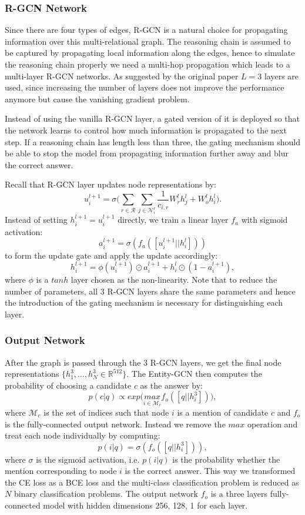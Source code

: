 \documentclass[12pt]{report}
\begin{document}
\subsubsection{R-GCN Network}
Since there are four types of edges, R-GCN is a natural choice for propagating information over this multi-relational graph. The reasoning chain is assumed to be captured by propagating local information along the edges, hence to simulate the reasoning chain properly we need a multi-hop propagation which leads to a multi-layer R-GCN networks. As suggested by the original paper $L=3$ layers are used, since increasing the number of layers does not improve the performance anymore but cause the vanishing gradient problem.

Instead of using the vanilla R-GCN layer, a gated version of it is deployed so that the network learns to control how much information is propagated to the next step. If a reasoning chain has length less than three, the gating mechanism should be able to stop the model from propagating information further away and blur the correct answer.

Recall that R-GCN layer updates node representations by:
\[u_i^{l+1} = \sigma\bigg(\sum_{r\in\mathcal{R}}\sum_{j\in\mathcal{N}_i^r} \frac{1}{c_{i,r}}W_r^l h_j^l
+W_o^l h_i^l \bigg).\]
Instead of setting $h_i^{l+1}=u_i^{l+1}$ directly, we train a linear layer $f_a$ with sigmoid activation:
\[a_i^{l+1}=\sigma(f_a([u_i^{l+1}||h_i^l]))\]
to form the update gate and apply the update accordingly:
\[h_i^{l+1}=\phi(u_i^{l+1})\odot a_i^{l+1}+h_i^l\odot(1-a_i^{l+1}),\]
where $\phi$ is a $tanh$ layer chosen as the non-linearity. Note that to reduce the number of parameters, all 3 R-GCN layers share the same parameters and hence the introduction of the gating mechanism is necessary for distinguishing each layer. 

\subsubsection{Output Network}
After the graph is passed through the 3 R-GCN layers, we get the final node representations $\{h_1^3, \dots,h_N^3\in\mathbb{R}^{512}\}$. The Entity-GCN then computes the probability of choosing a candidate $c$ as the answer by:
\[p(c|q) \propto exp\bigg(\underset{i\in\mathcal{M}_c}{max} f_o([q||h_i^3])\bigg),\]
where $\mathcal{M}_c$ is the set of indices such that node $i$ is a mention of candidate $c$ and $f_o$ is the fully-connected output network. Instead we remove the $max$ operation and treat each node individually by computing:
\[p(i|q)=\sigma(f_o([q||h_i^3])),\]
where $\sigma$ is the sigmoid activation, i.e. $p(i|q)$ is the probability whether the mention corresponding to node $i$ is the correct answer. This way we transformed the CE loss as a BCE loss and the multi-class classification problem is reduced as $N$ binary classification problems. The output network $f_o$ is a three layers fully-connected model with hidden dimensions 256, 128, 1 for each layer.
\end{document}
